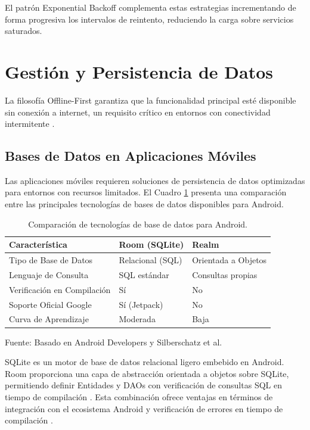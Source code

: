 El patrón Exponential Backoff complementa estas estrategias incrementando de forma progresiva los intervalos de reintento, reduciendo la carga sobre servicios saturados.

\section{Gestión y Persistencia de Datos}
\label{sec:persistencia}

La filosofía Offline-First garantiza que la funcionalidad principal esté disponible sin conexión a internet, un requisito crítico en entornos con conectividad intermitente \cite{guda2025offline}.

\subsection{Bases de Datos en Aplicaciones Móviles}

Las aplicaciones móviles requieren soluciones de persistencia de datos optimizadas para entornos con recursos limitados. El Cuadro \ref{tab:db_comparison} presenta una comparación entre las principales tecnologías de bases de datos disponibles para Android.

\begin{table}[H]
\centering
\begin{tabularx}{\linewidth}{p{3.5cm} p{4.5cm} p{4.5cm}}
\toprule
Característica & Room (SQLite) & Realm \\
\midrule
Tipo de Base de Datos & Relacional (SQL) & Orientada a Objetos \\
Lenguaje de Consulta & SQL estándar & Consultas propias \\
Verificación en Compilación & Sí & No \\
Soporte Oficial Google & Sí (Jetpack) & No \\
Curva de Aprendizaje & Moderada & Baja \\
\bottomrule
\end{tabularx}
\caption{Comparación de tecnologías de base de datos para Android.}\label{tab:db_comparison}
Fuente: Basado en Android Developers \cite{room_db} y Silberschatz et al. \cite{database_concepts}
\end{table}

SQLite es un motor de base de datos relacional ligero embebido en Android. Room proporciona una capa de abstracción orientada a objetos sobre SQLite, permitiendo definir Entidades y DAOs con verificación de consultas SQL en tiempo de compilación \cite{database_concepts}. Esta combinación ofrece ventajas en términos de integración con el ecosistema Android y verificación de errores en tiempo de compilación \cite{room_db}.

